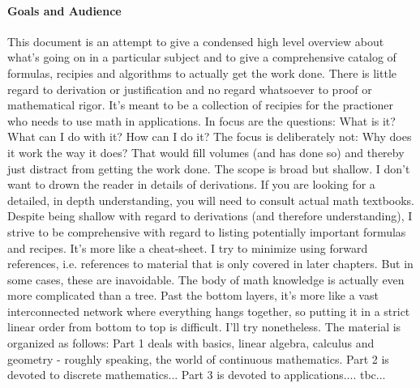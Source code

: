 \paragraph{Goals and Audience}
This document is an attempt to give a condensed high level overview about what's going on in a particular subject and to give a comprehensive catalog of formulas, recipies and algorithms to actually get the work done. There is little regard to derivation or justification and no regard whatsoever to proof or mathematical rigor. It's meant to be a collection of recipies for the practioner who needs to use math in applications. In focus are the questions: What is it? What can I do with it? How can I do it? The focus is deliberately not: Why does it work the way it does? That would fill volumes (and has done so) and thereby just distract from getting the work done. The scope is broad but shallow. I don't want to drown the reader in details of derivations. If you are looking for a detailed, in depth understanding, you will need to consult actual math textbooks. Despite being shallow with regard to derivations (and therefore understanding), I strive to be comprehensive with regard to listing potentially important formulas and recipes. It's more like a cheat-sheet. I try to minimize using forward references, i.e. references to material that is only covered in later chapters. But in some cases, these are inavoidable. The body of math knowledge is actually even more complicated than a tree. Past the bottom layers, it's more like a vast interconnected network where everything hangs together, so putting it in a strict linear order from bottom to top is difficult. I'll try nonetheless. The material is organized as follows: Part 1 deals with basics, linear algebra, calculus and geometry - roughly speaking, the world of continuous mathematics. Part 2 is devoted to discrete mathematics... Part 3 is devoted to applications.... tbc...



